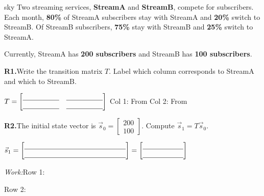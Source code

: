\documentclass[10pt]{article}
\begin{document}
\namepartnerperiod

\vspace{0.08in}

\begin{scenariobox}{sky}
Two streaming services, \textbf{StreamA} and \textbf{StreamB}, compete for subscribers.
Each month, \textbf{80\%} of StreamA subscribers stay with StreamA and \textbf{20\%} switch to StreamB.
Of StreamB subscribers, \textbf{75\%} stay with StreamB and \textbf{25\%} switch to StreamA.

Currently, StreamA has \textbf{200 subscribers} and StreamB has \textbf{100 subscribers}.
\end{scenariobox}

\vspace{0.08in}

\begin{tcolorbox}[colback=white, colframe=black!40,
    title=\textbf{Tier R --- Remediate},
    fonttitle=\bfseries, arc=2mm, left=3mm, right=3mm, top=2mm, bottom=2mm]

\textbf{R1.}\quad Write the transition matrix $T$. Label which column corresponds to StreamA and which to StreamB.

\vspace{6pt}
$T = \begin{bmatrix}\blank{1.8cm} & \blank{1.8cm} \\ \blank{1.8cm} & \blank{1.8cm}\end{bmatrix}$
\hfill {\small Col 1: From \blank{2cm} \quad Col 2: From \blank{2cm}}

\vspace{10pt}
\textbf{R2.}\quad The initial state vector is $\vec{s}_0 = \begin{bmatrix}200\\100\end{bmatrix}$.
Compute $\vec{s}_1 = T\vec{s}_0$.

\vspace{6pt}
$\vec{s}_1 = \begin{bmatrix}\blank{5cm} \\ \blank{5cm}\end{bmatrix}
= \begin{bmatrix}\blank{2cm} \\ \blank{2cm}\end{bmatrix}$

\vspace{6pt}
\textit{Work:}\quad Row 1: \blank{6cm}

\vspace{4pt}
\quad Row 2: \blank{6cm}

\end{tcolorbox}
\end{document}
